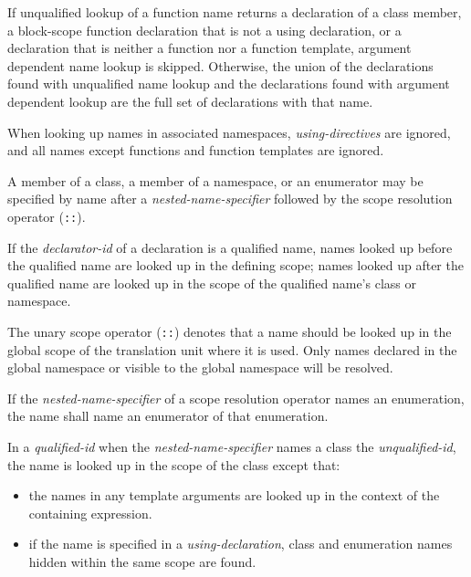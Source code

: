 \p If unqualified lookup of a function name returns a declaration of a class
member, a block-scope function declaration that is not a using declaration, or a
declaration that is neither a function nor a function template, argument
dependent name lookup is skipped. Otherwise, the union of the declarations found
with unqualified name lookup and the declarations found with argument dependent
lookup are the full set of declarations with that name.

\p When looking up names in associated namespaces, \textit{using-directives} are
ignored, and all names except functions and function templates are ignored.


\p A member of a class, a member of a namespace, or an enumerator may be
specified by name after a \textit{nested-name-specifier} followed by the scope
resolution operator (\texttt{::}).

\p If the \textit{declarator-id} of a declaration is a qualified name, names
looked up before the qualified name are looked up in the defining scope; names
looked up after the qualified name are looked up in the scope of the qualified
name's class or namespace.

\p The unary scope operator (\texttt{::}) denotes that a name should be looked
up in the global scope of the translation unit where it is used. Only names
declared in the global namespace or visible to the global namespace will be
resolved.

\p If the \textit{nested-name-specifier} of a scope resolution operator names an
enumeration, the name shall name an enumerator of that enumeration.


\p In a \textit{qualified-id} when the \textit{nested-name-specifier} names a
class the \textit{unqualified-id}, the name is looked up in the scope of the
class except that:

\begin{itemize}
\item the names in any template arguments are looked up in the context of the
containing expression.
\item if the name is specified in a \textit{using-declaration}, class and
enumeration names hidden within the same scope are found.
\end{itemize}


